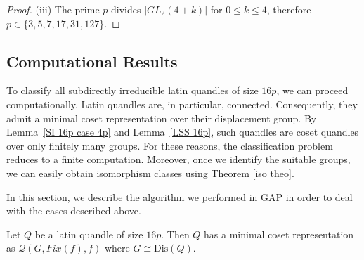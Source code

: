 \documentclass[a4paper, english, 9pt]{amsart}
\theoremstyle{plain}
\theoremstyle{definition}
\def\dis{\mathrm{Dis}}
\def\comment#1{{\color{red} #1}}
\def\LSS{\mathcal{LSS}}
\begin{document}
\begin{proof}
(iii) The prime $p$ divides $|GL_2(4+k)|$ for $0\leq k\leq 4$, therefore $p\in \{3,5,7,17,31,127\}$. %
%
%
\end{proof}


\subsection{Computational Results}\label{computational}

To classify all subdirectly irreducible latin quandles of size $16p$, we can proceed computationally. Latin quandles are, in particular, connected. Consequently, they admit a minimal coset representation over their displacement group.
    By Lemma~\ref{SI 16p case 4p} and Lemma~\ref{LSS 16p}, such quandles are coset quandles over only finitely many groups. For these reasons, the classification problem reduces to a finite computation. Moreover, once we identify the suitable groups, we can easily obtain isomorphism classes using Theorem \ref{iso theo}.
    
In this section, we describe the algorithm we performed in GAP in order to deal with the cases described above.

    Let $Q$ be a latin quandle of size $16p$. Then $Q$ has a minimal coset representation as $\mathcal{Q}(G,Fix(f),f)$ where $G\cong \dis(Q)$.
\end{document}
